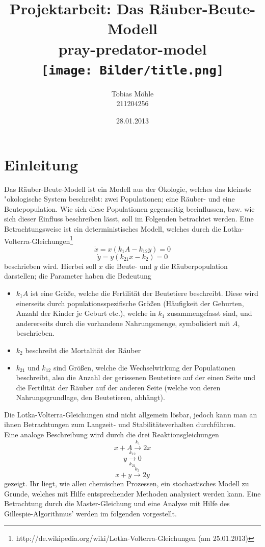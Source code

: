 \documentclass[11pt]{article}
\begin{document}
\begin{titlepage}
\title{\textbf{\Huge{Projektarbeit: Das Räuber-Beute-Modell}} \\ \large{pray-predator-model}\\ \texttt{[image: Bilder/title.png]}}
\author{Tobias Möhle \\ 211204256}
\date{28.01.2013}
\maketitle
\end{titlepage}
\tableofcontents

\section{Einleitung}
Das Räuber-Beute-Modell ist ein Modell aus der Ökologie, welches das kleinste "okologische System beschreibt: zwei Populationen; eine Räuber- und eine Beutepopulation. Wie sich diese Populationen gegenseitig beeinflussen, bzw. wie sich dieser Einfluss beschreiben lässt, soll im Folgenden betrachtet werden.
Eine Betrachtungsweise ist ein deterministisches Modell, welches durch die Lotka-Volterra-Gleichungen\footnote{http://de.wikipedia.org/wiki/Lotka-Volterra-Gleichungen (am 25.01.2013)}
$$\dot x=x(k_1 A-k_{12}y)=0$$
$$\dot y=y(k_{21}x-k_2)=0$$
beschrieben wird.
Hierbei soll $x$ die Beute- und $y$ die Räuberpopulation darstellen; die Parameter haben die Bedeutung
\begin{itemize}
   \item $k_1 A$ ist eine Größe, welche die Fertilität der Beutetiere beschreibt. Diese wird einerseits durch populationsspezifische Größen (Häufigkeit der Geburten, Anzahl der Kinder je Geburt etc.), welche in $k_1$ zusammengefasst sind, und andererseits durch die vorhandene Nahrungsmenge, symbolisiert mit $A$, beschrieben.
   \item $k_2$ beschreibt die Mortalität der Räuber
   \item $k_{21}$ und $k_{12}$ sind Größen, welche die Wechselwirkung der Populationen beschreibt, also die Anzahl der gerissenen Beutetiere auf der einen Seite und die Fertilität der Räuber auf der anderen Seite (welche von deren Nahrungsgrundlage, den Beutetieren, abhängt).
\end{itemize}

Die Lotka-Volterra-Gleichungen sind nicht allgemein lösbar, jedoch kann man an ihnen Betrachtungen zum Langzeit- und Stabilitätsverhalten durchführen.\\
Eine analoge Beschreibung wird durch die drei Reaktionsgleichungen 
$$x+A \xrightarrow{k_1} 2x $$
$$y \xrightarrow[k_{21}]{k_{12}} 0 $$
$$x+y \xrightarrow{k_2} 2y $$
gezeigt.
Ihr liegt, wie allen chemischen Prozessen, ein stochastisches Modell zu Grunde, welches mit Hilfe entsprechender Methoden analysiert werden kann. Eine Betrachtung durch die Master-Gleichung und eine Analyse mit Hilfe des Gillespie-Algorithmus' werden im folgenden vorgestellt.
\end{document}
